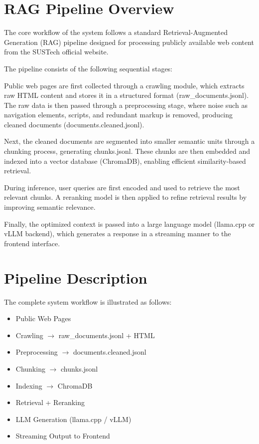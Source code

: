 \section{RAG Pipeline Overview}

The core workflow of the system follows a standard Retrieval-Augmented Generation (RAG) pipeline designed for processing publicly available web content from the SUSTech official website.

The pipeline consists of the following sequential stages:

Public web pages are first collected through a crawling module, which extracts raw HTML content and stores it in a structured format (raw\_documents.jsonl). The raw data is then passed through a preprocessing stage, where noise such as navigation elements, scripts, and redundant markup is removed, producing cleaned documents (documents.cleaned.jsonl).

Next, the cleaned documents are segmented into smaller semantic units through a chunking process, generating chunks.jsonl. These chunks are then embedded and indexed into a vector database (ChromaDB), enabling efficient similarity-based retrieval.

During inference, user queries are first encoded and used to retrieve the most relevant chunks. A reranking model is then applied to refine retrieval results by improving semantic relevance.

Finally, the optimized context is passed into a large language model (llama.cpp or vLLM backend), which generates a response in a streaming manner to the frontend interface.

\section{Pipeline Description}

The complete system workflow is illustrated as follows:

\begin{itemize}
    \item Public Web Pages
    \item Crawling $\rightarrow$ raw\_documents.jsonl + HTML
    \item Preprocessing $\rightarrow$ documents.cleaned.jsonl
    \item Chunking $\rightarrow$ chunks.jsonl
    \item Indexing $\rightarrow$ ChromaDB
    \item Retrieval + Reranking
    \item LLM Generation (llama.cpp / vLLM)
    \item Streaming Output to Frontend
\end{itemize}

